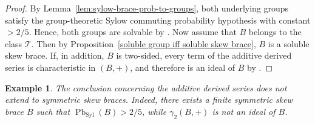 \documentclass[10pt,a4paper]{amsart}
\numberwithin{equation}{section}
\newtheorem{example}[equation]{Example}
\newcommand{\Pb}{\operatorname{Pb} }
\newcommand{\Syl}{\operatorname{Syl} }
\begin{document}
\begin{proof}
By Lemma~\ref{lem:sylow-brace-prob-to-groups}, both underlying groups
satisfy the group-theoretic Sylow commuting probability hypothesis with
constant $>2/5$. Hence, both groups are solvable by \cite{DLMS25}. 
Now assume that $B$ belongs to the class $\mathcal T$. Then by Proposition~\ref{soluble group iff soluble skew brace}, $B$ is a soluble skew brace. If, in addition, $B$ is two-sided, every term of the additive derived series is characteristic in $(B,+)$, and therefore is an ideal of $B$ by \cite[Lemma 4.1]{Nas19}.
\end{proof}


\begin{example} %
The conclusion concerning the additive derived series does not extend to symmetric skew braces. Indeed, there exists a finite symmetric skew brace $B$ such that $\Pb_{\Syl}(B)>2/5$, while $\gamma_2(B,+)$ is not an ideal of $B$.
\end{example}
\end{document}

